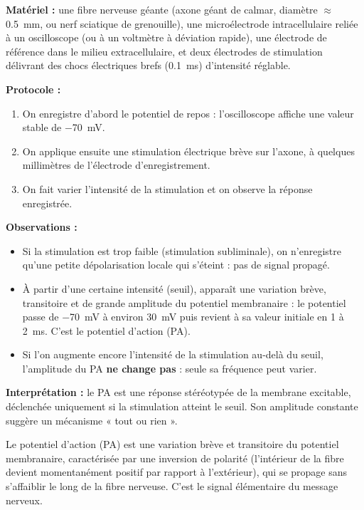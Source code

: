 \documentclass[11pt]{article}
\newcommand{\cle}[1]{{\popxbold\color{popdark}#1}}
\begin{document}
\begin{experience}
\textbf{Matériel :} une fibre nerveuse géante (axone géant de calmar, diamètre $\approx$ \SI{0,5}{mm}, ou nerf sciatique de grenouille), une microélectrode intracellulaire reliée à un oscilloscope (ou à un voltmètre à déviation rapide), une électrode de référence dans le milieu extracellulaire, et deux électrodes de stimulation délivrant des chocs électriques brefs (\SI{0,1}{ms}) d'intensité réglable.

\textbf{Protocole :}
\begin{enumerate}
\item On enregistre d'abord le potentiel de repos : l'oscilloscope affiche une valeur stable de \SI{-70}{mV}.
\item On applique ensuite une stimulation électrique brève sur l'axone, à quelques millimètres de l'électrode d'enregistrement.
\item On fait varier l'intensité de la stimulation et on observe la réponse enregistrée.
\end{enumerate}

\textbf{Observations :}
\begin{itemize}
\item Si la stimulation est trop faible (\cle{stimulation subliminale}), on n'enregistre qu'une petite dépolarisation locale qui s'éteint : pas de signal propagé.
\item À partir d'une certaine intensité (\cle{seuil}), apparaît une variation brève, transitoire et de grande amplitude du potentiel membranaire : le potentiel passe de \SI{-70}{mV} à environ \SI{+30}{mV} puis revient à sa valeur initiale en 1 à \SI{2}{ms}. C'est le \cle{potentiel d'action} (PA).
\item Si l'on augmente encore l'intensité de la stimulation au-delà du seuil, l'amplitude du PA \textbf{ne change pas} : seule sa fréquence peut varier.
\end{itemize}

\textbf{Interprétation :} le PA est une réponse stéréotypée de la membrane excitable, déclenchée uniquement si la stimulation atteint le seuil. Son amplitude constante suggère un mécanisme « tout ou rien ».
\end{experience}

\begin{definition}
Le \cle{potentiel d'action} (PA) est une variation brève et transitoire du potentiel membranaire, caractérisée par une inversion de polarité (l'intérieur de la fibre devient momentanément positif par rapport à l'extérieur), qui se propage sans s'affaiblir le long de la fibre nerveuse. C'est le \cle{signal élémentaire du message nerveux}.
\end{definition}
\end{document}
